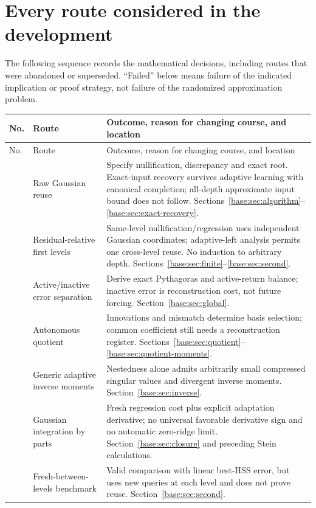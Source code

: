 \documentclass[11pt,oneside,openany,a4paper]{book}
\numberwithin{equation}{chapter}
\theoremstyle{definition}
\theoremstyle{remark}
\begin{document}
\section{Every route considered in the development}\label{base:new:route-history}
The following sequence records the mathematical decisions, including routes that were abandoned or superseded. ``Failed'' below means failure of the indicated implication or proof strategy, not failure of the randomized approximation problem.
\begin{longtable}{@{}>{\RaggedRight\arraybackslash}p{.06\linewidth}>{\RaggedRight\arraybackslash}p{.29\linewidth}>{\RaggedRight\arraybackslash}p{.57\linewidth}@{}}
\toprule No.&Route&Outcome, reason for changing course, and location\\\midrule\endfirsthead
\toprule No.&Route&Outcome, reason for changing course, and location\\\midrule\endhead\bottomrule\endfoot
1&Raw Gaussian reuse&Specify nullification, discrepancy and exact root. Exact-input recovery survives adaptive learning with canonical completion; all-depth approximate input bound does not follow. Sections~\ref{base:sec:algorithm}--\ref{base:sec:exact-recovery}.\\
2&Residual-relative first levels&Same-level nullification/regression uses independent Gaussian coordinates; adaptive-left analysis permits one cross-level reuse. No induction to arbitrary depth. Sections~\ref{base:sec:finite}--\ref{base:sec:second}.\\
3&Active/inactive error separation&Derive exact Pythagoras and active-return balance; inactive error is reconstruction cost, not future forcing. Section~\ref{base:sec:global}.\\
4&Autonomous quotient&Innovations and mismatch determine basis selection; common coefficient still needs a reconstruction register. Sections~\ref{base:sec:quotient}--\ref{base:sec:quotient-moments}.\\
5&Generic adaptive inverse moments&Nestedness alone admits arbitrarily small compressed singular values and divergent inverse moments. Section~\ref{base:sec:inverse}.\\
6&Gaussian integration by parts&Fresh regression cost plus explicit adaptation derivative; no universal favorable derivative sign and no automatic zero-ridge limit. Section~\ref{base:sec:closure} and preceding Stein calculations.\\
7&Fresh-between-levels benchmark&Valid comparison with linear best-HSS error, but uses new queries at each level and does not prove reuse. Section~\ref{base:sec:second}.\\

\end{longtable}
\end{document}
